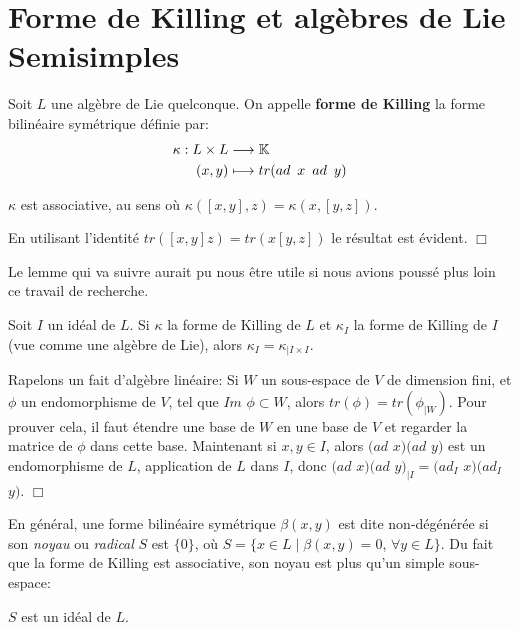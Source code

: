 \documentclass[a4paper,openany,12pt]{report}
\newcommand{\KK}{\mathbb{K}}
\theoremstyle{break}
{\theorembodyfont{\upshape}
\newtheorem*{rmq}{Remarque :}
\newtheorem*{prv}{Preuve :}
\newtheorem*{ex}{Exemples :}
\newtheorem*{exe}{Exemple : }
\newtheorem*{nota}{Notation :}
\newtheorem*{dem}{D\'emonstration :}}
\begin{document}
\chapter{Forme de Killing et algèbres de Lie Semisimples}

\begin{df}
\quad Soit $L$ une algèbre de Lie quelconque. On appelle \textbf{forme de Killing} la forme bilinéaire symétrique définie par:
\begin{align*}
\kappa : L \times L & \longrightarrow \KK \\
(x,y) & \longmapsto tr(ad \enskip x \enskip ad \enskip y)
\end{align*}
\end{df}

\begin{prop}
\quad $\kappa$ est associative, au sens où $\kappa([x,y],z)=\kappa(x,[y,z])$.
\end{prop}

\begin{prv}
En utilisant l'identité $tr([x,y]z)=tr(x[y,z])$ le résultat est évident. $\Box$
\end{prv}

Le lemme qui va suivre aurait pu nous être utile si nous avions poussé plus loin ce travail de recherche. 

\begin{lem}
\quad Soit $I$ un idéal de $L$. Si $\kappa$ la forme de Killing de $L$ et $\kappa_I$ la forme de Killing de $I$ (vue comme une algèbre de Lie), alors $\kappa_I = \kappa_{\mid I \times I}$.
\end{lem}

\begin{prv}
\quad Rapelons un fait d'algèbre linéaire: Si $W$ un sous-espace de $V$ de dimension fini, et $\phi$ un endomorphisme de $V$, tel que $Im$ $\phi \subset W$, alors $tr(\phi) = tr(\phi_{\mid W})$. Pour prouver cela, il faut étendre une base de $W$ en une base de $V$ et regarder la matrice de $\phi$ dans cette base. Maintenant si $x,y \in I$, alors $(ad$ $x)(ad$ $y)$ est un endomorphisme de $L$, application de $L$ dans $I$, donc $(ad$ $x)(ad$ $y)_{\mid I}=(ad_I$ $x)(ad_I$ $y)$. $\Box$
\end{prv}

En général, une forme bilinéaire symétrique $\beta(x,y)$ est dite non-dégénérée si son \textit{noyau} ou \textit{radical} $S$ est $\{0\}$, où $S = \{ x \in L \mid \beta(x,y)=0$, $\forall y \in L \}$. Du fait que la forme de Killing est associative, son noyau est plus qu'un simple sous-espace: 
\begin{center}
$S$ est un idéal de $L$. 
\end{center}
\end{document}
